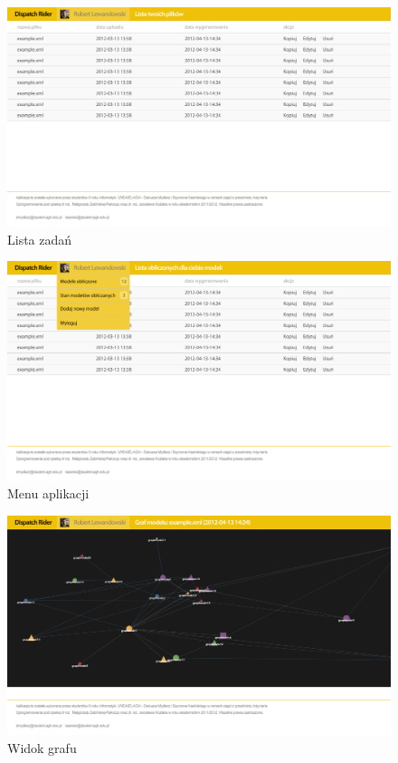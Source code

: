 \vfill\hfill

\begin{center}
\begin{figure}[H]
\centering
\includegraphics[scale=0.3]{imgs/logged_home.jpg}
\caption{Lista zadań}
\label{fig:tasks_list}
\end{figure}
\end{center}

\begin{center}
\begin{figure}[H]
\centering
\includegraphics[scale=0.3]{imgs/logged_home_menu.jpg}
\caption{Menu aplikacji}
\label{fig:app_menu}
\end{figure}
\end{center}

\begin{center}
\begin{figure}[H]
\centering
\includegraphics[scale=0.3]{imgs/logged_graph_viewjpg.jpg}
\caption{Widok grafu}
\label{fig:graph_view}
\end{figure}
\end{center}
